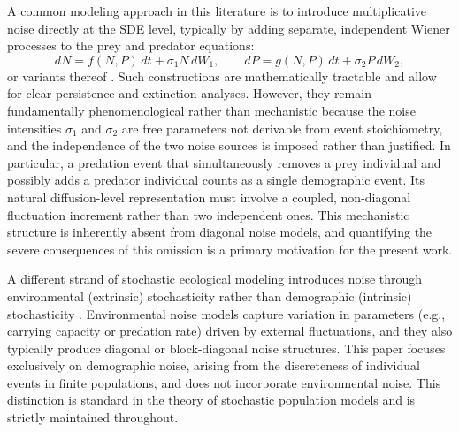 \documentclass[pdflatex,sn-mathphys-ay]{sn-jnl}
\theoremstyle{thmstyleone}
\theoremstyle{definition}
\theoremstyle{remark}
\begin{document}
A common modeling approach in this literature is to introduce multiplicative noise directly at the SDE level, typically by adding separate, independent Wiener processes to the prey and predator equations:
\begin{equation*}
dN = f(N,P)\,dt + \sigma_1 N\,dW_1,\qquad
dP = g(N,P)\,dt + \sigma_2 P\,dW_2,
\end{equation*}
or variants thereof \citep{huang_stochastic_2021,du_conditions_2016,qi_threshold_2021,yasin_spatio-temporal_2023,liu_dynamics_2018}. 
Such constructions are mathematically tractable and allow for clear persistence and extinction analyses.
However, they remain fundamentally phenomenological rather than mechanistic because the noise intensities $\sigma_1$ and $\sigma_2$ are free parameters not derivable from event stoichiometry, and the independence of the two noise sources is imposed rather than justified. 
In particular, a predation event that simultaneously removes a prey individual and possibly adds a predator individual counts as a single demographic event. 
Its natural diffusion-level representation must involve a coupled, non-diagonal fluctuation increment rather than two independent ones. 
This mechanistic structure is inherently absent from diagonal noise models, and quantifying the severe consequences of this omission is a primary motivation for the present work.

A different strand of stochastic ecological modeling introduces noise through environmental (extrinsic) stochasticity rather than demographic (intrinsic) stochasticity \citep{wu_stochastic_2019,chatterjee_predatorprey_2024,das_modelling_2021,belabbas_rich_2021}. 
Environmental noise models capture variation in parameters (e.g., carrying capacity or predation rate) driven by external fluctuations, and they also typically produce diagonal or block-diagonal noise structures. 
This paper focuses exclusively on demographic noise, arising from the discreteness of individual events in finite populations, and does not incorporate environmental noise. 
This distinction is standard in the theory of stochastic population models \citep{newman_extinction_2004,ovaskainen_stochastic_2010,wang_analysis_2025,dobramysl_environmental_2013} and is strictly maintained throughout.
\end{document}
